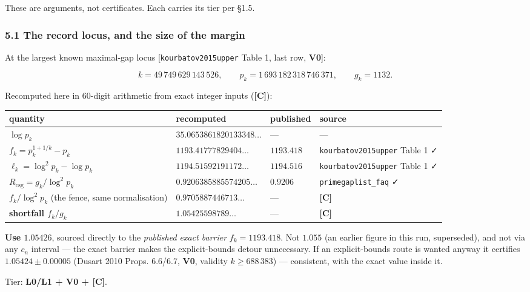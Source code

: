 \documentclass[
  a4paper,
  11pt]{article}
\begin{document}
These are arguments, not certificates. Each carries its tier per §1.5.

\subsubsection{5.1 The record locus, and the size of the
margin}\label{51-the-record-locus-and-the-size-of-the-margin}

At the largest known maximal-gap locus {[}\texttt{kourbatov2015upper}
Table 1, last row, \textbf{V0}{]}:

\[k = 49\,749\,629\,143\,526, \qquad p_k = 1\,693\,182\,318\,746\,371, \qquad g_k = 1132.\]

Recomputed here in 60-digit arithmetic from exact integer inputs
(\textbf{{[}C{]}}):

\begin{longtable}[]{@{}llll@{}}
\toprule\noalign{}
quantity & recomputed & published & source \\
\midrule\noalign{}
\endhead
\bottomrule\noalign{}
\endlastfoot
\(\log p_k\) & \(35.0653861820133348\ldots\) & --- & --- \\
\(f_k = p_k^{1+1/k}-p_k\) & \(1193.41777829404\ldots\) & \(1193.418\) &
\texttt{kourbatov2015upper} Table 1 ✓ \\
\(\ell_k = \log^2 p_k-\log p_k\) & \(1194.51592191172\ldots\) &
\(1194.516\) & \texttt{kourbatov2015upper} Table 1 ✓ \\
\(R_{\mathrm{csg}} = g_k/\log^2 p_k\) & \(0.9206385885574205\ldots\) &
\(0.9206\) & \texttt{primegaplist\_faq} ✓ \\
\(f_k/\log^2 p_k\) (the fence, same normalisation) &
\(0.9705887446713\ldots\) & --- & \textbf{{[}C{]}} \\
\textbf{shortfall \(f_k/g_k\)} & \(\mathbf{1.05425598789\ldots}\) & ---
& \textbf{{[}C{]}} \\
\end{longtable}

\textbf{Use \(1.05426\)}, sourced directly to the \emph{published exact
barrier} \(f_k = 1193.418\). Not \(1.055\) (an earlier figure in this
run, superseded), and not via any \(c_n\) interval --- the exact barrier
makes the explicit-bounds detour unnecessary. If an explicit-bounds
route is wanted anyway it certifies \(1.05424 \pm 0.00005\) (Dusart 2010
Props. 6.6/6.7, \textbf{V0}, validity \(k \ge 688\,383\)) ---
consistent, with the exact value inside it.

Tier: \textbf{L0/L1 + V0 + {[}C{]}}.
\end{document}
